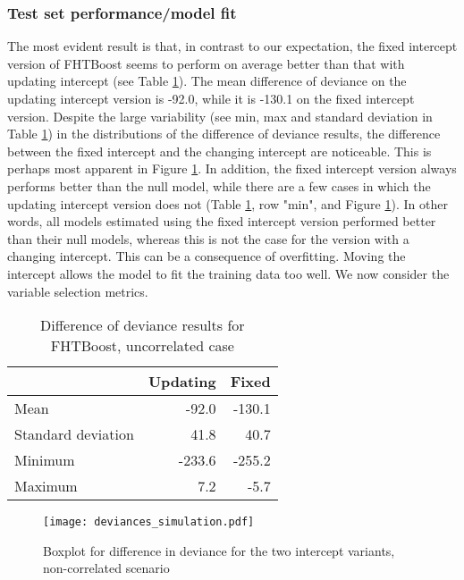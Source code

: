 \subsubsection{Test set performance/model fit}
The most evident result is that, in contrast to our expectation, the fixed intercept version of FHTBoost seems to perform on average better than that with updating intercept (see Table \ref{table:uncorrelated-deviance}).
The mean difference of deviance on the updating intercept version is -92.0, while it is -130.1 on the fixed intercept version.
Despite the large variability (see min, max and standard deviation in Table \ref{table:uncorrelated-deviance}) in the distributions of the difference of deviance results, the difference between the fixed intercept and the changing intercept are noticeable.
This is perhaps most apparent in Figure \ref{fig:simulation-uncorrelated-deviances-boxplot}.
In addition, the fixed intercept version always performs better than the null model, while there are a few cases in which the updating intercept version does not (Table \ref{table:uncorrelated-deviance}, row "min", and Figure \ref{fig:simulation-uncorrelated-deviances-boxplot}).
In other words, all models estimated using the fixed intercept version performed better than their null models, whereas this is not the case for the version with a changing intercept.
This can be a consequence of overfitting.
Moving the intercept allows the model to fit the training data too well.
We now consider the variable selection metrics.

\begin{table}
\caption{Difference of deviance results for FHTBoost, uncorrelated case}
\label{table:uncorrelated-deviance}
\centering
\begin{tabular}{l|rr}
\toprule
& Updating & Fixed \\
\hline
Mean               &  -92.0  & -130.1  \\
Standard deviation &   41.8  &   40.7  \\
Minimum            & -233.6  & -255.2  \\
Maximum            &    7.2  &   -5.7  \\
\bottomrule
\end{tabular}
\end{table}

\begin{figure}
\caption{Boxplot for difference in deviance for the two intercept variants, non-correlated scenario}
\label{fig:simulation-uncorrelated-deviances-boxplot}
\centering
\texttt{[image: deviances\_simulation.pdf]}
\end{figure}

